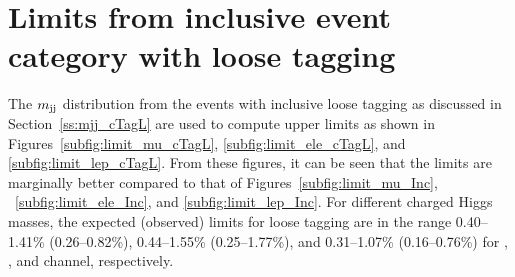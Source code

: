 \section{Limits from inclusive event category with loose  tagging}
\label{ss:limit_cTagL}
The $m_\text{jj}$ distribution from the events with inclusive loose \PQc tagging as discussed 
in Section~\ref{ss:mjj_cTagL} are used to compute upper limits as shown in
Figures~\ref{subfig:limit_mu_cTagL}, \ref{subfig:limit_ele_cTagL}, and \ref{subfig:limit_lep_cTagL}. 
From these figures, it can be seen that the limits are marginally better compared to that 
of Figures~\ref{subfig:limit_mu_Inc}, ~\ref{subfig:limit_ele_Inc}, and \ref{subfig:limit_lep_Inc}. 
For different charged Higgs masses, the expected (observed) limits for loose \PQc tagging are in the 
range 0.40--1.41\% (0.26--0.82\%), 0.44--1.55\% (0.25--1.77\%), and 0.31--1.07\% (0.16--0.76\%)
for \mujets, \ejets, and \ljets channel, respectively.

